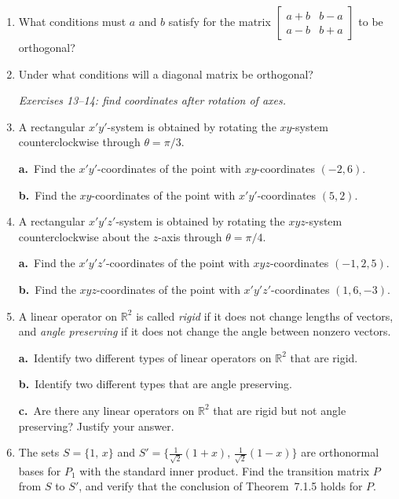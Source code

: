 \documentclass{article}
\theoremstyle{mystyle}
\begin{document}
\begin{enumerate}
\item[11.] What conditions must $a$ and $b$ satisfy for the matrix
$\begin{bmatrix}a+b&b-a\\a-b&b+a\end{bmatrix}$
to be orthogonal?

\item[12.] Under what conditions will a diagonal matrix be orthogonal?

\noindent\textit{Exercises 13--14: find coordinates after rotation of axes.}

\item[13.] A rectangular $x'y'$-system is obtained by rotating the $xy$-system
counterclockwise through $\theta=\pi/3$.

\textbf{a.}\ Find the $x'y'$-coordinates of the point with $xy$-coordinates $(-2,6)$.

\textbf{b.}\ Find the $xy$-coordinates of the point with $x'y'$-coordinates $(5,2)$.

\item[15.] A rectangular $x'y'z'$-system is obtained by rotating the $xyz$-system
counterclockwise about the $z$-axis through $\theta=\pi/4$.

\textbf{a.}\ Find the $x'y'z'$-coordinates of the point with $xyz$-coordinates $(-1,2,5)$.

\textbf{b.}\ Find the $xyz$-coordinates of the point with $x'y'z'$-coordinates $(1,6,-3)$.

\item[21.] A linear operator on $\mathbb{R}^2$ is called \emph{rigid} if it does not
change lengths of vectors, and \emph{angle preserving} if it does not change the angle
between nonzero vectors.

\textbf{a.}\ Identify two different types of linear operators on $\mathbb{R}^2$ that are rigid.

\textbf{b.}\ Identify two different types that are angle preserving.

\textbf{c.}\ Are there any linear operators on $\mathbb{R}^2$ that are rigid but not angle
preserving? Justify your answer.

\item[24.] The sets $S=\{1,\,x\}$ and $S'=\bigl\{\tfrac{1}{\sqrt{2}}(1+x),\,\tfrac{1}{\sqrt{2}}(1-x)\bigr\}$
are orthonormal bases for $P_1$ with the standard inner product. Find the transition
matrix $P$ from $S$ to $S'$, and verify that the conclusion of Theorem~7.1.5 holds for $P$.


\end{enumerate}
\end{document}
